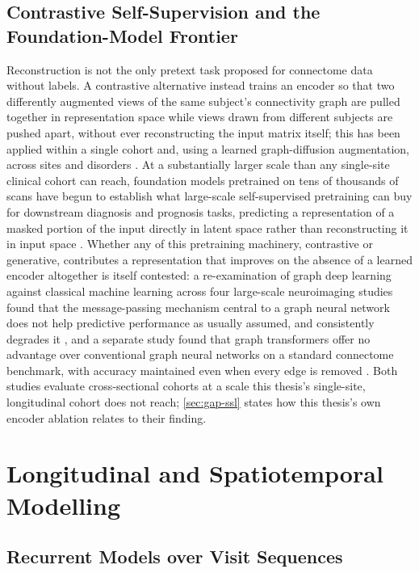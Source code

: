 \subsection{Contrastive Self-Supervision and the Foundation-Model Frontier}\label{sec:contrastive-and-foundation}

Reconstruction is not the only pretext task proposed for connectome data without labels.
A contrastive alternative instead trains an encoder so that two differently augmented
views of the same subject's connectivity graph are pulled together in representation space
while views drawn from different subjects are pushed apart, without ever reconstructing the
input matrix itself; this has been applied within a single cohort
\parencite{wang2023ucgl} and, using a learned graph-diffusion augmentation, across sites and
disorders \parencite{wang2025gcda}. At a substantially larger scale than any single-site
clinical cohort can reach, foundation models pretrained on tens of thousands of scans have
begun to establish what large-scale self-supervised pretraining can buy for downstream
diagnosis and prognosis tasks, predicting a representation of a masked portion of the input
directly in latent space rather than reconstructing it in input space
\parencite{dong2024brainjepa}. Whether any of this pretraining machinery, contrastive or
generative, contributes a representation that improves on the absence of a learned encoder
altogether is itself contested: a re-examination of graph deep learning against classical
machine learning across four large-scale neuroimaging studies found that the message-passing
mechanism central to a graph neural network does not help predictive performance as usually
assumed, and consistently degrades it \parencite{han2026rethinking}, and a separate study
found that graph transformers offer no advantage over conventional graph neural networks on
a standard connectome benchmark, with accuracy maintained even when every edge is removed
\parencite{lararangel2025limits}. Both studies evaluate cross-sectional cohorts at a scale
this thesis's single-site, longitudinal cohort does not reach; \autoref{sec:gap-ssl} states
how this thesis's own encoder ablation relates to their finding.

\section{Longitudinal and Spatiotemporal Modelling}\label{sec:longitudinal-modelling}

\subsection{Recurrent Models over Visit Sequences}\label{sec:recurrent-background}

